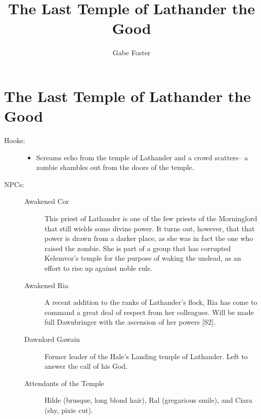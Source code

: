 \documentclass[11pt]{article}
\theoremstyle{definition}
\theoremstyle{remark}
\begin{document}
	\title{The Last Temple of Lathander the Good}
	\date{\vspace{-24pt}}
	\author{Gabe Foster}
	\maketitle

\section{The Last Temple of Lathander the Good}

\begin{description}

\item[Hooks:]

\begin{itemize}

\item{Screams echo from the temple of Lathander and a crowd scatters-- a zombie shambles out from the doors of the temple.}

\end{itemize}

\item[NPCs:]
\begin{description}

\item[Awakened Cor] This priest of Lathander is one of the few priests of the Morninglord that still wields some divine power.  It turns out, however, that that power is drawn from a darker place, as she was in fact the one who raised the zombie. She is part of a group that has corrupted Kelemvor's temple for the purpose of waking the undead, as an effort to rise up against noble rule.

\item[Awakened Ria]

A recent addition to the ranks of Lathander's flock, Ria has come to command a great deal of respect from her colleagues. Will be made full Dawnbringer with the ascension of her powers [S2].

\item[Dawnlord Gawain]

Former leader of the Hale's Landing temple of Lathander. Left to answer the call of his God.

\item[Attendants of the Temple]
Hilde (brusque, long blond hair), Ral (gregarious smile), and Ciara (shy, pixie cut).

\end{description}


\end{description}
\end{document}
